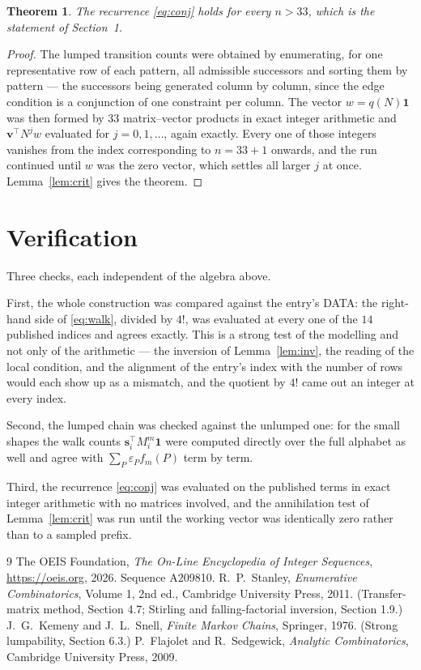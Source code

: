 \documentclass[11pt,a4paper]{article}
\theoremstyle{plain}
\newtheorem{theorem}{Theorem}
\theoremstyle{definition}
\begin{document}
\begin{theorem}
The recurrence \eqref{eq:conj} holds for every $n>33$, which is the statement of
Section~1.
\end{theorem}

\begin{proof}
The lumped transition counts were obtained by enumerating, for one representative row of
each pattern, all admissible successors and sorting them by pattern --- the successors being
generated column by column, since the edge condition is a conjunction of one constraint per
column. The vector $w=q(N)\mathbf{1}$ was then formed by $33$ matrix--vector products
in exact integer arithmetic and $\mathbf{v}^{\!\top}N^{j}w$ evaluated for
$j=0,1,\dots$, again exactly. Every one of those integers vanishes from the index
corresponding to $n=33+1$ onwards, and the run continued until $w$ was the zero vector,
which settles all larger $j$ at once. Lemma~\ref{lem:crit} gives the theorem.
\end{proof}

\section{Verification}

Three checks, each independent of the algebra above.

First, the whole construction was compared against the entry's DATA: the right-hand side of
\eqref{eq:walk}, divided by $4!$, was evaluated at every one of the $14$
published indices and agrees exactly. This is a strong test of the modelling and not only of
the arithmetic --- the inversion of Lemma~\ref{lem:inv}, the reading of the local
condition, and the alignment of the entry's index with the number of rows would each
show up as a mismatch, and the quotient by $4!$ came out an integer at every index.

Second, the lumped chain was checked against the unlumped one: for the small shapes the walk
counts $\mathbf{s}_i^{\!\top}M_i^{m}\mathbf{1}$ were computed directly over the full
alphabet as well and agree with $\sum_P\varepsilon_Pf_m(P)$ term by term.

Third, the recurrence \eqref{eq:conj} was evaluated on the published terms in exact integer
arithmetic with no matrices involved, and the annihilation test of Lemma~\ref{lem:crit} was
run until the working vector was identically zero rather than to a sampled prefix.

\begin{thebibliography}{9}
 The OEIS Foundation, \emph{The On-Line Encyclopedia of Integer
Sequences}, \url{https://oeis.org}, 2026. Sequence A209810.
 R.~P.~Stanley, \emph{Enumerative Combinatorics}, Volume 1, 2nd ed.,
Cambridge University Press, 2011. (Transfer-matrix method, Section 4.7; Stirling and
falling-factorial inversion, Section 1.9.)
 J.~G.~Kemeny and J.~L.~Snell, \emph{Finite Markov Chains}, Springer,
1976. (Strong lumpability, Section 6.3.)
 P.~Flajolet and R.~Sedgewick, \emph{Analytic Combinatorics}, Cambridge
University Press, 2009.
\end{thebibliography}
\end{document}
